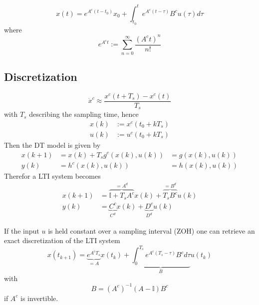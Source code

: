
\begin{equation*}
    x(t) = e^{A^c(t-t_0)}x_0 + \int_{t_0}^{t}e^{A^c(t-\tau)}B^c u(\tau)d\tau
\end{equation*}
where
\begin{equation*}
    e^{A^c t} := \sum_{n=0}^{\infty}\frac{{(A^c t)}^n}{n!}
\end{equation*}

\subsection{Discretization}

\begin{equation*}
    \dot{x}^c \approx \frac{x^c(t + T_s)-x^c(t)}{T_s}
\end{equation*}
with $T_s$ describing the sampling time, hence
\begin{align*}
    x(k) & := x^c(t_0 + kT_s) \\
    u(k) & := u^c(t_0 + kT_s)
\end{align*}
Then the DT model is given by
\begin{align*}
    x(k+1) & = x(k) + T_s g^c (x(k),u(k)) & = g(x(k),u(k)) \\
    y(k)   & = h^c(x(k),u(k))             & = h(x(k),u(k))
\end{align*}
Therefor a LTI system becomes
\begin{align*}
    x(k+1) & = \overbrace{\mathbb{I} + T_s A^c}^{=A^d} x(k) + \overbrace{T_s B^c}^{=B^d} u(k) \\
    y(k)   & = \underbrace{C^c}_{C^d} x(k) + \underbrace{D^c}_{D^d} u(k)
\end{align*}

\newpar{}

If the input $u$ is held constant over a sampling interval (ZOH) one can retrieve an exact discretization of the LTI system
\begin{equation*}
    x(t_{k+1}) = \underbrace{e^{A^c T_s}}_{=A} x(t_k) + \underbrace{\int_{0}^{T_s} e^{A^c(T_s - \tau)}B^c d\tau}_{B} u(t_k)
\end{equation*}
with
\begin{equation*}
    B={(A^c)}^{-1}(A-\mathbb{I})B^c
\end{equation*}
if $A^c$ is invertible.

\newpar{}

